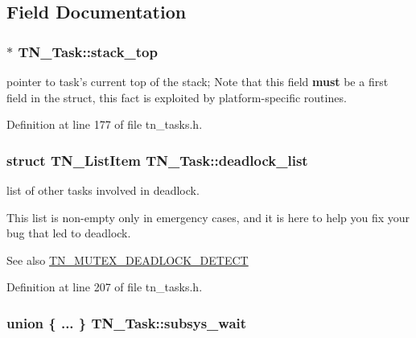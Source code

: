 \subsection{Field Documentation}
\hypertarget{structTN__Task_a6e31948663b2846ac9dddc05f529286a}{
\subsubsection[{stack\+\_\+top}]{$\ast$ T\+N\+\_\+\+Task\+::stack\+\_\+top}}\label{structTN__Task_a6e31948663b2846ac9dddc05f529286a}


pointer to task's current top of the stack; Note that this field {\bfseries must} be a first field in the struct, this fact is exploited by platform-\/specific routines. 



Definition at line 177 of file tn\+\_\+tasks.\+h.

\hypertarget{structTN__Task_a097e79851e01fb3c73f0346d99ea8b7e}{
\subsubsection[{deadlock\+\_\+list}]{\setlength{\rightskip}{0pt plus 5cm}struct T\+N\+\_\+\+List\+Item T\+N\+\_\+\+Task\+::deadlock\+\_\+list}}\label{structTN__Task_a097e79851e01fb3c73f0346d99ea8b7e}


list of other tasks involved in deadlock. 

This list is non-\/empty only in emergency cases, and it is here to help you fix your bug that led to deadlock.

\begin{DoxySeeAlso}{See also}
{\ttfamily \hyperlink{tn__cfg__default_8h_a6ed3ec7b0d4338e7f60dde86b7ea5fa4}{T\+N\+\_\+\+M\+U\+T\+E\+X\+\_\+\+D\+E\+A\+D\+L\+O\+C\+K\+\_\+\+D\+E\+T\+E\+C\+T}} 
\end{DoxySeeAlso}


Definition at line 207 of file tn\+\_\+tasks.\+h.

\hypertarget{structTN__Task_a7b1e431e2e2c65d8de74d48b44cf68ee}{
\subsubsection[{subsys\+\_\+wait}]{\setlength{\rightskip}{0pt plus 5cm}union \{ ... \}   T\+N\+\_\+\+Task\+::subsys\+\_\+wait}}\label{structTN__Task_a7b1e431e2e2c65d8de74d48b44cf68ee}


